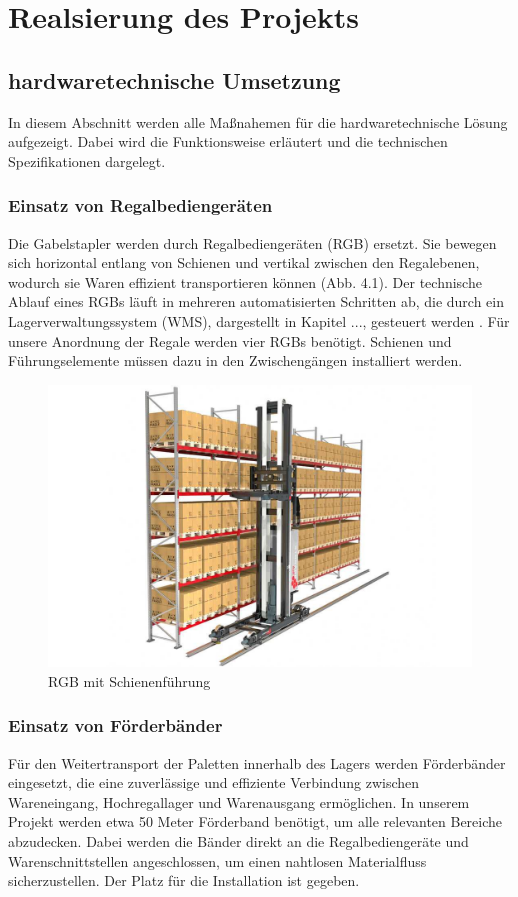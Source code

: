 \chapter{Realsierung des Projekts}

\section{hardwaretechnische Umsetzung}
In diesem Abschnitt werden alle Maßnahemen für die hardwaretechnische Lösung aufgezeigt. Dabei wird die Funktionsweise erläutert und die technischen Spezifikationen dargelegt.
\subsection{Einsatz von Regalbediengeräten}
Die Gabelstapler werden durch Regalbediengeräten (RGB) ersetzt. Sie bewegen sich horizontal entlang von Schienen und vertikal zwischen den Regalebenen, wodurch sie Waren effizient transportieren können (Abb. 4.1).
Der technische Ablauf eines RGBs läuft in mehreren automatisierten Schritten ab, die durch ein Lagerverwaltungssystem (WMS), dargestellt in Kapitel ..., gesteuert werden \autocite{heinrich2021}. Für unsere Anordnung der Regale werden vier RGBs benötigt. Schienen und Führungselemente müssen dazu in den Zwischengängen installiert werden.

\begin{figure}
	\centering
	\includegraphics[width=0.5\linewidth]{images/RGB}
	\caption{RGB mit Schienenführung}
	\label{fig:rgb}
\end{figure}


\subsection{Einsatz von Förderbänder}
Für den Weitertransport der Paletten innerhalb des Lagers werden Förderbänder eingesetzt, die eine zuverlässige und effiziente Verbindung zwischen Wareneingang, Hochregallager und Warenausgang ermöglichen. In unserem Projekt werden etwa 50 Meter Förderband benötigt, um alle relevanten Bereiche abzudecken. Dabei werden die Bänder direkt an die Regalbediengeräte und Warenschnittstellen angeschlossen, um einen nahtlosen Materialfluss sicherzustellen. Der Platz für die Installation ist gegeben.


